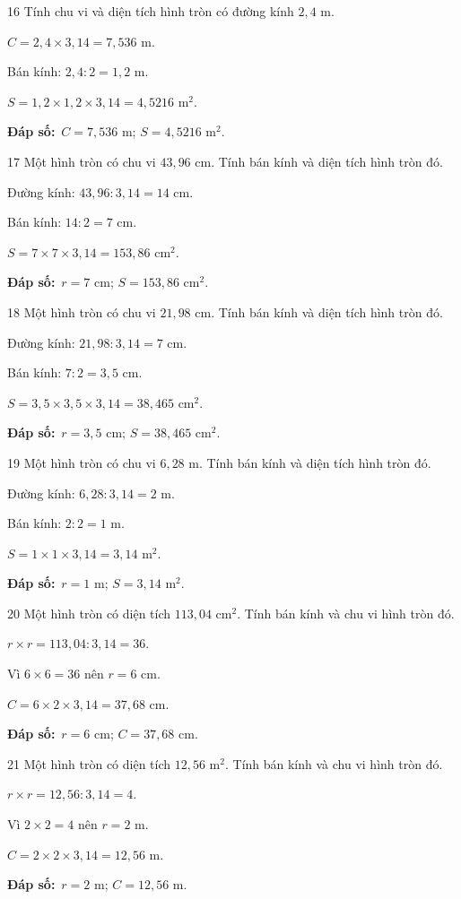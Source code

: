 \documentclass[11pt]{article}
\newif\ifsol \solfalse
\providecommand{\AnsWord}{Đáp số}
\newcommand{\dapso}[1]{\par\textbf{\AnsWord:}\ #1}
\newcommand{\probsol}[1]{%
  \begin{lrbox}{\solmeasure}\begin{minipage}{\dimexpr\linewidth-24pt\relax}#1\end{minipage}\end{lrbox}%
  \ifsol
    \begin{solbox}#1\end{solbox}%
  \else
    \setlength{\solht}{\dimexpr\ht\solmeasure+\dp\solmeasure+0.85cm\relax}%
    \ifdim\solht<1.35cm\setlength{\solht}{1.35cm}\fi
    \begin{tcolorbox}[colback=white,colframe=Line,boxrule=0.8pt,arc=5pt,
      left=8pt,right=8pt,top=4pt,bottom=4pt,height=\solht]{\footnotesize\color{Slate}\itshape\WorkWord}\end{tcolorbox}%
  \fi}
\newcommand{\gap}{\vspace{0.3cm}}
\def\WorkWord{Bài làm:}
\def\AnsWord{Đáp số}
\begin{document}
\gap
\begin{probbox}{16}{\relax}
Tính chu vi và diện tích hình tròn có đường kính $2{,}4$ m.
\end{probbox}
\probsol{
$C=2{,}4\times3{,}14=7{,}536$ m.\par Bán kính: $2{,}4:2=1{,}2$ m.\par $S=1{,}2\times1{,}2\times3{,}14=4{,}5216$ m$^2$.
\dapso{$C=7{,}536$ m; $S=4{,}5216$ m$^2$.}}
\gap
\begin{probbox}{17}{\relax}
Một hình tròn có chu vi $43{,}96$ cm. Tính bán kính và diện tích hình tròn đó.
\end{probbox}
\probsol{
Đường kính: $43{,}96:3{,}14=14$ cm.\par Bán kính: $14:2=7$ cm.\par $S=7\times7\times3{,}14=153{,}86$ cm$^2$.
\dapso{$r=7$ cm; $S=153{,}86$ cm$^2$.}}
\gap
\begin{probbox}{18}{\relax}
Một hình tròn có chu vi $21{,}98$ cm. Tính bán kính và diện tích hình tròn đó.
\end{probbox}
\probsol{
Đường kính: $21{,}98:3{,}14=7$ cm.\par Bán kính: $7:2=3{,}5$ cm.\par $S=3{,}5\times3{,}5\times3{,}14=38{,}465$ cm$^2$.
\dapso{$r=3{,}5$ cm; $S=38{,}465$ cm$^2$.}}
\gap
\begin{probbox}{19}{\relax}
Một hình tròn có chu vi $6{,}28$ m. Tính bán kính và diện tích hình tròn đó.
\end{probbox}
\probsol{
Đường kính: $6{,}28:3{,}14=2$ m.\par Bán kính: $2:2=1$ m.\par $S=1\times1\times3{,}14=3{,}14$ m$^2$.
\dapso{$r=1$ m; $S=3{,}14$ m$^2$.}}
\gap
\begin{probbox}{20}{\relax}
Một hình tròn có diện tích $113{,}04$ cm$^2$. Tính bán kính và chu vi hình tròn đó.
\end{probbox}
\probsol{
$r\times r=113{,}04:3{,}14=36$.\par Vì $6\times6=36$ nên $r=6$ cm.\par $C=6\times2\times3{,}14=37{,}68$ cm.
\dapso{$r=6$ cm; $C=37{,}68$ cm.}}
\gap
\begin{probbox}{21}{\relax}
Một hình tròn có diện tích $12{,}56$ m$^2$. Tính bán kính và chu vi hình tròn đó.
\end{probbox}
\probsol{
$r\times r=12{,}56:3{,}14=4$.\par Vì $2\times2=4$ nên $r=2$ m.\par $C=2\times2\times3{,}14=12{,}56$ m.
\dapso{$r=2$ m; $C=12{,}56$ m.}}
\end{document}
